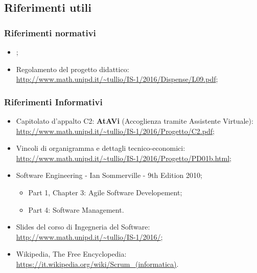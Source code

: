 \documentclass[../PianoDiProgetto.tex]{subfiles}
\begin{document}
	\subsection{Riferimenti utili}
		\subsubsection{Riferimenti normativi}
		\begin{itemize}
			\item \textit{\normediprogettov};
			\item Regolamento del progetto didattico:\\
			\url{http://www.math.unipd.it/~tullio/IS-1/2016/Dispense/L09.pdf};
		\end{itemize}
	
		\subsubsection{Riferimenti Informativi}
		\begin{itemize}
			\item Capitolato d'appalto C2: \textbf{AtAVi} (Accoglienza tramite Assistente Virtuale): \\ \url{http://www.math.unipd.it/~tullio/IS-1/2016/Progetto/C2.pdf};
			\item Vincoli di organigramma e dettagli tecnico-economici:\\
			\url{http://www.math.unipd.it/~tullio/IS-1/2016/Progetto/PD01b.html};
			\item Software Engineering - Ian Sommerville - 9th Edition 2010;
			\begin{itemize}
				\item Part 1, Chapter 3: Agile Software Developement;
				\item Part 4: Software Management.
			\end{itemize}
			\item Slides del corso di Ingegneria del Software:\\
			\url{http://www.math.unipd.it/~tullio/IS-1/2016/};
			\item Wikipedia, The Free Encyclopedia:\\
			\url{https://it.wikipedia.org/wiki/Scrum_(informatica)}.
		\end{itemize}
\end{document}
